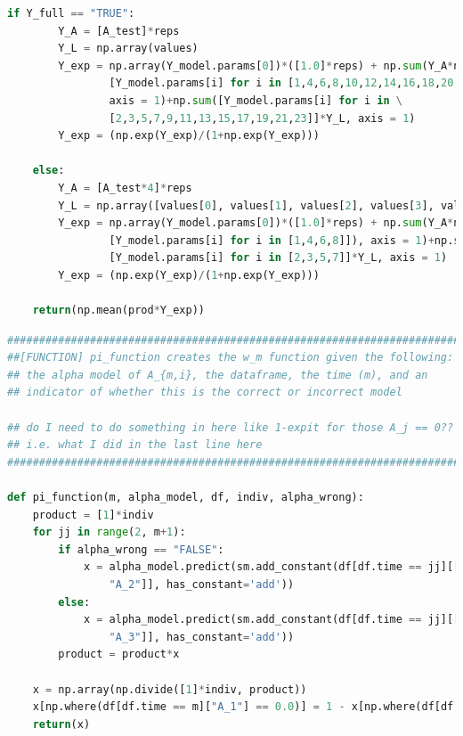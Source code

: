 \begin{lstlisting}[language=Python]
    if Y_full == "TRUE": 
        Y_A = [A_test]*reps
        Y_L = np.array(values)
        Y_exp = np.array(Y_model.params[0])*([1.0]*reps) + np.sum(Y_A*np.array(\
                [Y_model.params[i] for i in [1,4,6,8,10,12,14,16,18,20,22,24]]), \
                axis = 1)+np.sum([Y_model.params[i] for i in \
                [2,3,5,7,9,11,13,15,17,19,21,23]]*Y_L, axis = 1)
        Y_exp = (np.exp(Y_exp)/(1+np.exp(Y_exp)))
        
    else: 
        Y_A = [A_test*4]*reps
        Y_L = np.array([values[0], values[1], values[2], values[3], values[4]])
        Y_exp = np.array(Y_model.params[0])*([1.0]*reps) + np.sum(Y_A*np.array(\
                [Y_model.params[i] for i in [1,4,6,8]]), axis = 1)+np.sum(\
                [Y_model.params[i] for i in [2,3,5,7]]*Y_L, axis = 1)
        Y_exp = (np.exp(Y_exp)/(1+np.exp(Y_exp)))

    return(np.mean(prod*Y_exp)) 
\end{lstlisting}

\begin{lstlisting}[language=Python]
#########################################################################
##[FUNCTION] pi_function creates the w_m function given the following:
## the alpha model of A_{m,i}, the dataframe, the time (m), and an 
## indicator of whether this is the correct or incorrect model 

## do I need to do something in here like 1-expit for those A_j == 0?? 
## i.e. what I did in the last line here 
#########################################################################

def pi_function(m, alpha_model, df, indiv, alpha_wrong): 
    product = [1]*indiv
    for jj in range(2, m+1): 
        if alpha_wrong == "FALSE": 
            x = alpha_model.predict(sm.add_constant(df[df.time == jj][["L1", "L1_1", "A_1", \
                "A_2"]], has_constant='add'))
        else: 
            x = alpha_model.predict(sm.add_constant(df[df.time == jj][["L1_3", \
                "A_3"]], has_constant='add'))
        product = product*x
    
    x = np.array(np.divide([1]*indiv, product))
    x[np.where(df[df.time == m]["A_1"] == 0.0)] = 1 - x[np.where(df[df.time == m]["A_1"] == 0.0)]
    return(x)    
\end{lstlisting}

